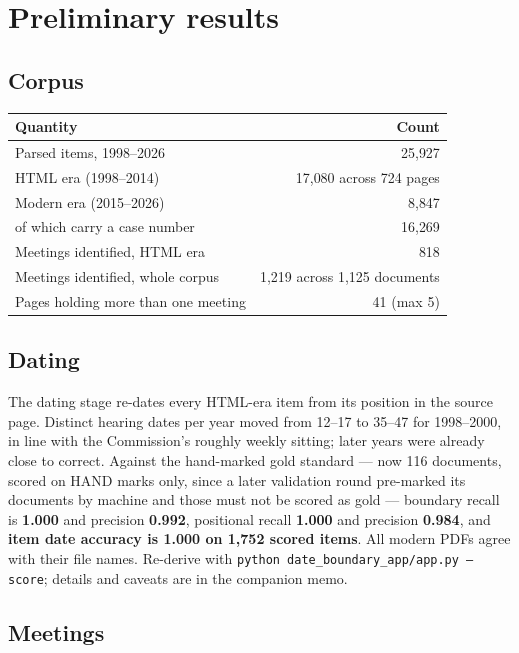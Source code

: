 \documentclass[11pt]{article}
\begin{document}
\section{Preliminary results}

\subsection{Corpus}

\begin{table}[h]
\centering
\begin{tabular}{lr}
\toprule
Quantity & Count \\
\midrule
Parsed items, 1998--2026 & 25{,}927 \\
\quad HTML era (1998--2014) & 17{,}080 across 724 pages \\
\quad Modern era (2015--2026) & 8{,}847 \\
\quad of which carry a case number & 16{,}269 \\
Meetings identified, HTML era & 818 \\
Meetings identified, whole corpus & 1{,}219 across 1{,}125 documents \\
Pages holding more than one meeting & 41 (max 5) \\
\bottomrule
\end{tabular}
\end{table}

\subsection{Dating}

The dating stage re-dates every HTML-era item from its position in the source page.
Distinct hearing dates per year moved from 12--17 to 35--47 for 1998--2000, in line with the
Commission's roughly weekly sitting; later years were already close to correct. Against the
hand-marked gold standard --- now 116 documents, scored on HAND marks only, since a later
validation round pre-marked its documents by machine and those must not be scored as gold
--- boundary recall is \textbf{1.000} and precision \textbf{0.992}, positional recall
\textbf{1.000} and precision \textbf{0.984}, and \textbf{item date accuracy is 1.000 on
1{,}752 scored items}. All modern PDFs agree with their file names. Re-derive with
\texttt{python date\_boundary\_app/app.py --score}; details and caveats are in the companion
memo.

\subsection{Meetings}
\end{document}
